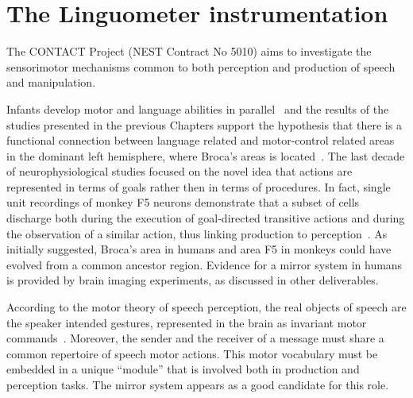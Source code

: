 \section{The Linguometer instrumentation}
\label{ch:linguometer}
The CONTACT Project (NEST Contract No 5010) aims to investigate the
sensorimotor mechanisms common to both perception and production of speech and
manipulation.

Infants develop motor and language abilities in
parallel~\citep{lennenberg:1967,kandel.schwartz.jessel:2000} 
and the results of the studies presented in the previous Chapters support the
hypothesis that there is a functional connection between language related and
motor-control related areas in the dominant left
hemisphere, where Broca's areas is located~\citep{fadiga.etal:PRESS}. 
The last decade of neurophysiological studies focused on the novel idea that
actions are represented in terms of goals rather then in terms of
procedures.
In fact, single unit recordings of monkey F5 neurons demonstrate that a subset
of cells discharge both during the execution of goal-directed transitive 
actions and during the observation of a similar action, thus linking production
to perception~\citep{rizzolatti.etal:1996}.
As~\citet{rizzolatti.arbib:1998} initially suggested, Broca's area in humans 
and area F5 in monkeys could have evolved from a common ancestor region.
Evidence for a mirror system in humans is provided by brain imaging 
experiments, as discussed in other deliverables.

According to the motor theory of speech perception, the real objects of speech
are the speaker intended gestures, represented in the brain as invariant motor 
commands~\citep{liberman.mattingly:1985}.
Moreover, the sender and the receiver of a message must share a common
repertoire of speech motor actions. 
This motor vocabulary must be embedded in a unique ``module'' that is involved
both in production and perception tasks.
The mirror system appears as a good candidate for this role.

